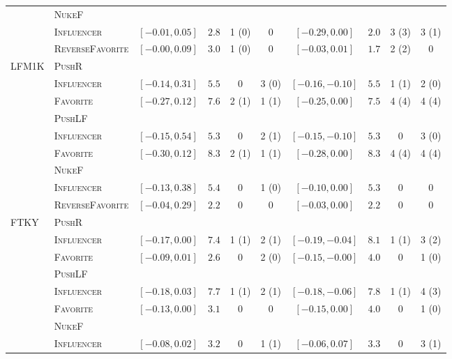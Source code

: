 \begin{table}
\begin{adjustbox}{max width=\textwidth}
\begin{tabular}{l l cccc cccc}
\cmidrule(lr){2-10}
 & \multicolumn{9}{l}{\textsc{NukeF}} \\
 & \quad \textsc{Influencer} & $[-0.01, 0.05]$ & $2.8$ & 1 (0) & 0 & $[-0.29, 0.00]$ & $2.0$ & 3 (3) & 3 (1) \\
 & \quad \textsc{ReverseFavorite} & $[-0.00, 0.09]$ & $3.0$ & 1 (0) & 0 & $[-0.03, 0.01]$ & $1.7$ & 2 (2) & 0 \\
\cmidrule(lr){1-10}
\multirow{9}{*}{LFM1K} & \multicolumn{9}{l}{\textsc{PushR}} \\
 & \quad \textsc{Influencer} & $[-0.14, 0.31]$ & $5.5$ & 0 & 3 (0) & $[-0.16, -0.10]$ & $5.5$ & 1 (1) & 2 (0) \\
 & \quad \textsc{Favorite} & $[-0.27, 0.12]$ & $7.6$ & 2 (1) & 1 (1) & $[-0.25, 0.00]$ & $7.5$ & 4 (4) & 4 (4) \\
\addlinespace[2pt]
 & \multicolumn{9}{l}{\textsc{PushLF}} \\
 & \quad \textsc{Influencer} & $[-0.15, 0.54]$ & $5.3$ & 0 & 2 (1) & $[-0.15, -0.10]$ & $5.3$ & 0 & 3 (0) \\
 & \quad \textsc{Favorite} & $[-0.30, 0.12]$ & $8.3$ & 2 (1) & 1 (1) & $[-0.28, 0.00]$ & $8.3$ & 4 (4) & 4 (4) \\
\cmidrule(lr){2-10}
 & \multicolumn{9}{l}{\textsc{NukeF}} \\
 & \quad \textsc{Influencer} & $[-0.13, 0.38]$ & $5.4$ & 0 & 1 (0) & $[-0.10, 0.00]$ & $5.3$ & 0 & 0 \\
 & \quad \textsc{ReverseFavorite} & $[-0.04, 0.29]$ & $2.2$ & 0 & 0 & $[-0.03, 0.00]$ & $2.2$ & 0 & 0 \\
\cmidrule(lr){1-10}
\multirow{9}{*}{FTKY} & \multicolumn{9}{l}{\textsc{PushR}} \\
 & \quad \textsc{Influencer} & $[-0.17, 0.00]$ & $7.4$ & 1 (1) & 2 (1) & $[-0.19, -0.04]$ & $8.1$ & 1 (1) & 3 (2) \\
 & \quad \textsc{Favorite} & $[-0.09, 0.01]$ & $2.6$ & 0 & 2 (0) & $[-0.15, -0.00]$ & $4.0$ & 0 & 1 (0) \\
\addlinespace[2pt]
 & \multicolumn{9}{l}{\textsc{PushLF}} \\
 & \quad \textsc{Influencer} & $[-0.18, 0.03]$ & $7.7$ & 1 (1) & 2 (1) & $[-0.18, -0.06]$ & $7.8$ & 1 (1) & 4 (3) \\
 & \quad \textsc{Favorite} & $[-0.13, 0.00]$ & $3.1$ & 0 & 0 & $[-0.15, 0.00]$ & $4.0$ & 0 & 1 (0) \\
\cmidrule(lr){2-10}
 & \multicolumn{9}{l}{\textsc{NukeF}} \\
 & \quad \textsc{Influencer} & $[-0.08, 0.02]$ & $3.2$ & 0 & 1 (1) & $[-0.06, 0.07]$ & $3.3$ & 0 & 3 (1) \\

\end{tabular}
\end{adjustbox}
\end{table}
